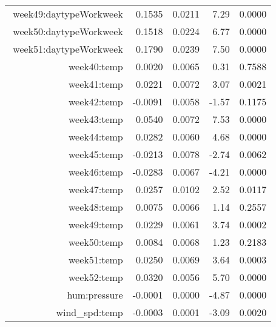 \begin{table}[ht]
\begin{tabular}{rrrrr}
$$  week49:daytypeWorkweek & 0.1535 & 0.0211 & 7.29 & 0.0000 \\ 
  week50:daytypeWorkweek & 0.1518 & 0.0224 & 6.77 & 0.0000 \\ 
  week51:daytypeWorkweek & 0.1790 & 0.0239 & 7.50 & 0.0000 \\ 
  week40:temp & 0.0020 & 0.0065 & 0.31 & 0.7588 \\ 
  week41:temp & 0.0221 & 0.0072 & 3.07 & 0.0021 \\ 
  week42:temp & -0.0091 & 0.0058 & -1.57 & 0.1175 \\ 
  week43:temp & 0.0540 & 0.0072 & 7.53 & 0.0000 \\ 
  week44:temp & 0.0282 & 0.0060 & 4.68 & 0.0000 \\ 
  week45:temp & -0.0213 & 0.0078 & -2.74 & 0.0062 \\ 
  week46:temp & -0.0283 & 0.0067 & -4.21 & 0.0000 \\ 
  week47:temp & 0.0257 & 0.0102 & 2.52 & 0.0117 \\ 
  week48:temp & 0.0075 & 0.0066 & 1.14 & 0.2557 \\ 
  week49:temp & 0.0229 & 0.0061 & 3.74 & 0.0002 \\ 
  week50:temp & 0.0084 & 0.0068 & 1.23 & 0.2183 \\ 
  week51:temp & 0.0250 & 0.0069 & 3.64 & 0.0003 \\ 
  week52:temp & 0.0320 & 0.0056 & 5.70 & 0.0000 \\ 
  hum:pressure & -0.0001 & 0.0000 & -4.87 & 0.0000 \\ 
  wind\_spd:temp & -0.0003 & 0.0001 & -3.09 & 0.0020 \\ 
   \hline
\end{tabular}
\end{table}
